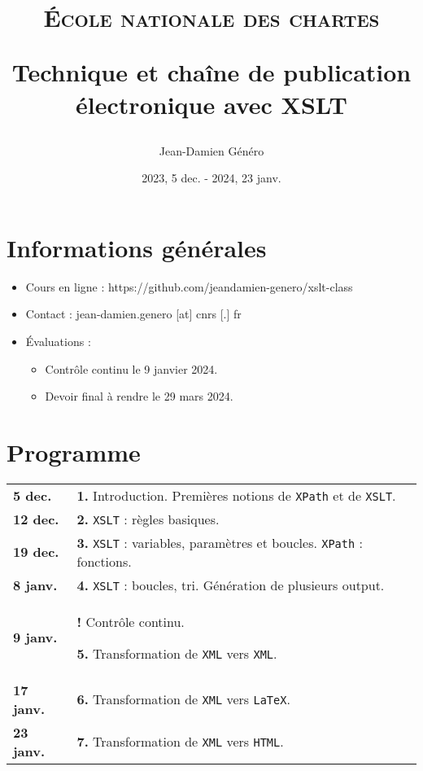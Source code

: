 \documentclass[a4paper]{article}
\title{\textsc{École nationale des chartes}

\bigskip

Technique et chaîne de publication électronique avec XSLT}
\author{Jean-Damien Généro}
\date{2023, 5 dec. - 2024, 23 janv.}
\begin{document}
\maketitle

\section*{Informations générales}

\begin{itemize}
    \item Cours en ligne : https://github.com/jeandamien-genero/xslt-class
    \item Contact : jean-damien.genero [at] cnrs [.] fr
    \item Évaluations :
    \begin{itemize}
        \item Contrôle continu le 9 janvier 2024.
        \item Devoir final à rendre le 29 mars 2024.
    \end{itemize}
\end{itemize}

\bigskip

\section*{Programme}

\renewcommand{\arraystretch}{1.5}
\begin{center}
    \begin{tabular}[h]{|p{1.5cm} p{9.6cm}}
        \textbf{5 dec.} & \textbf{1.} Introduction. Premières notions de \texttt{XPath} et de \texttt{XSLT}.\\
        \textbf{12 dec.} & \textbf{2.} \texttt{XSLT} : règles basiques.  \\
        \textbf{19 dec.} & \textbf{3.} \texttt{XSLT} : variables, paramètres et boucles. \texttt{XPath} : fonctions. \\
        \textbf{8 janv.} & \textbf{4.} \texttt{XSLT} :  boucles, tri. Génération de plusieurs output. \\
        \textbf{9 janv.} & \textbf{!}  Contrôle continu.
        
        \textbf{5.} Transformation de \texttt{XML}  vers \texttt{XML}. \\
        \textbf{17 janv.} & \textbf{6.} Transformation de \texttt{XML}  vers \texttt{LaTeX}. \\
        \textbf{23 janv.} & \textbf{7.} Transformation de \texttt{XML}  vers \texttt{HTML}. \\
    \end{tabular}
\end{center}
\end{document}
